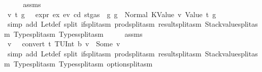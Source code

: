 \begin{isabellebody}
\ \ \isamarkupfalse%
\ \isamarkupfalse%
\ assms\ {}\ {}\ \isamarkupfalse%
\ v\ t\ g{\isacharprime}{\kern0pt}\ \ {}{\isacharcolon}{\kern0pt}\ {\isachardoublequoteopen}expr\ ex\ ev\ cd\ {\isacharparenleft}{\kern0pt}st{\isasymlparr}gas\ {\isacharcolon}{\kern0pt}{\isacharequal}{\kern0pt}\ g{\isasymrparr}{\isacharparenright}{\kern0pt}\ g\ {\isacharequal}{\kern0pt}\ Normal\ {\isacharparenleft}{\kern0pt}{\isacharparenleft}{\kern0pt}KValue\ v{\isacharcomma}{\kern0pt}\ Value\ t{\isacharparenright}{\kern0pt}{\isacharcomma}{\kern0pt}\ g{\isacharprime}{\kern0pt}{\isacharparenright}{\kern0pt}{\isachardoublequoteclose}\ \isamarkupfalse%
\ {\isacharparenleft}{\kern0pt}simp\ add{\isacharcolon}{\kern0pt}\ Let{\isacharunderscore}{\kern0pt}def\ split{\isacharcolon}{\kern0pt}\ if{\isacharunderscore}{\kern0pt}split{\isacharunderscore}{\kern0pt}asm\ prod{\isachardot}{\kern0pt}split{\isacharunderscore}{\kern0pt}asm\ result{\isachardot}{\kern0pt}split{\isacharunderscore}{\kern0pt}asm\ Stackvalue{\isachardot}{\kern0pt}split{\isacharunderscore}{\kern0pt}asm\ Type{\isachardot}{\kern0pt}split{\isacharunderscore}{\kern0pt}asm\ Types{\isachardot}{\kern0pt}split{\isacharunderscore}{\kern0pt}asm{\isacharparenright}{\kern0pt}\isanewline
\ \ \isamarkupfalse%
\ \isamarkupfalse%
\ assms\ {}\ {}\ {}\ \isamarkupfalse%
\ v{\isacharprime}{\kern0pt}\ \ {}{\isacharcolon}{\kern0pt}\ {\isachardoublequoteopen}convert\ t\ {\isacharparenleft}{\kern0pt}TUInt\ b{}{}{}{\isacharparenright}{\kern0pt}\ v\ {\isacharequal}{\kern0pt}\ Some\ v{\isacharprime}{\kern0pt}{\isachardoublequoteclose}\ \isamarkupfalse%
\ {\isacharparenleft}{\kern0pt}simp\ add{\isacharcolon}{\kern0pt}\ Let{\isacharunderscore}{\kern0pt}def\ split{\isacharcolon}{\kern0pt}\ if{\isacharunderscore}{\kern0pt}split{\isacharunderscore}{\kern0pt}asm\ prod{\isachardot}{\kern0pt}split{\isacharunderscore}{\kern0pt}asm\ result{\isachardot}{\kern0pt}split{\isacharunderscore}{\kern0pt}asm\ Stackvalue{\isachardot}{\kern0pt}split{\isacharunderscore}{\kern0pt}asm\ Type{\isachardot}{\kern0pt}split{\isacharunderscore}{\kern0pt}asm\ Types{\isachardot}{\kern0pt}split{\isacharunderscore}{\kern0pt}asm\ option{\isachardot}{\kern0pt}split{\isacharunderscore}{\kern0pt}asm{\isacharparenright}{\kern0pt}\isanewline
\ \ \isamarkupfalse%
\ \isamarkupfalse%

\end{isabellebody}
